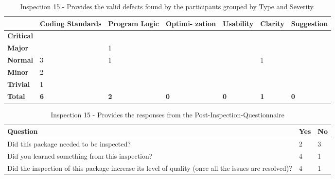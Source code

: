 \begin{table}[!h]
  \begin{center}
    \caption[Inspection 15 - Results by Type and Severity]{Inspection 15 -
      Provides the valid defects found by the participants grouped by Type
      and Severity.}
    \label{tab:inspection-results-15-type}
    \begin{tabular}{|p{2.0cm}|p{1.7cm}|p{1.5cm}|p{1.7cm}|p{1.4cm}|p{1.4cm}|p{1.5cm}|}  \hline   
\small{} & \small{}{\bf Coding Standards} & 
\small{}{\bf Program Logic} & \small{} {\bf Optimi- zation} & 
\small{}{\bf Usability} & \small{} {\bf Clarity} & 
\small{} {\bf Suggestion} \\ \hline

{\bf Critical} &   &   &   &   &   &   \\ \hline
{\bf Major}    &   & 1 &   &   &   &   \\ \hline
{\bf Normal}   & 3 & 1 &   &   & 1 &   \\ \hline
{\bf Minor}    & 2 &   &   &   &   &   \\ \hline
{\bf Trivial}  & 1 &   &   &   &   &   \\ \hline

{\bf Total} & {\bf 6} & {\bf 2} & {\bf 0} & {\bf 0} & {\bf 1} & {\bf 0} \\ \hline
    \end{tabular}
  \end{center}
\end{table}


\begin{table}[!h]
  \begin{center}
    \caption[Post Inspection 15 - Responses]{Inspection 15 - Provides the
      responses from the Post-Inspection-Questionnaire}
    \label{tab:post-inspection-questionnaire-results-15}
    \begin{tabular}{|p{8.0cm}|p{2.5cm}|p{2.5cm}|} \hline
{\bf Question} & {\bf Yes} & {\bf No} \\ \hline
Did this package needed to be inspected?  & 2 & 3 \\ \hline
Did you learned something from this inspection?  & 4 & 1 \\ \hline
Did the inspection of this package increase its level of quality (once all
the issues are resolved)? & 4 & 1 \\ \hline
    \end{tabular}
  \end{center}
\end{table}

